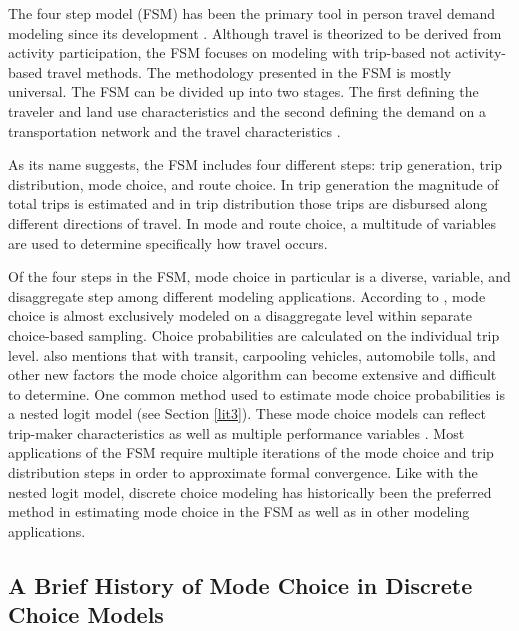 \documentclass[3p, authoryear, review]{elsarticle} %
\begin{document}
The four step model (FSM) has been the primary tool in person travel demand modeling since its development \citep{mcnally2000four}. Although travel is theorized to be derived from activity participation, the FSM focuses on modeling with trip-based not activity-based travel methods. The methodology presented in the FSM is mostly universal. The FSM can be divided up into two stages. The first defining the traveler and land use characteristics and the second defining the demand on a transportation network and the travel characteristics \citep{mcnally2000four}.

As its name suggests, the FSM includes four different steps: trip generation, trip distribution, mode choice, and route choice. In trip generation the magnitude of total trips is estimated and in trip distribution those trips are disbursed along different directions of travel. In mode and route choice, a multitude of variables are used to determine specifically how travel occurs.

Of the four steps in the FSM, mode choice in particular is a diverse, variable, and disaggregate step among different modeling applications. According to \citet{mcnally2000four}, mode choice is almost exclusively modeled on a disaggregate level within separate choice-based sampling. Choice probabilities are calculated on the individual trip level. \citet{mcnally2000four} also mentions that with transit, carpooling vehicles, automobile tolls, and other new factors the mode choice algorithm can become extensive and difficult to determine. One common method used to estimate mode choice probabilities is a nested logit model (see Section \ref{lit3}). These mode choice models can reflect trip-maker characteristics as well as multiple performance variables \citep{ortuzar94, mcnally2000four}. Most applications of the FSM require multiple iterations of the mode choice and trip distribution steps in order to approximate formal convergence. Like with the nested logit model, discrete choice modeling has historically been the preferred method in estimating mode choice in the FSM as well as in other modeling applications.

\hypertarget{lit2}{%
\subsection{A Brief History of Mode Choice in Discrete Choice Models}\label{lit2}}
\end{document}
